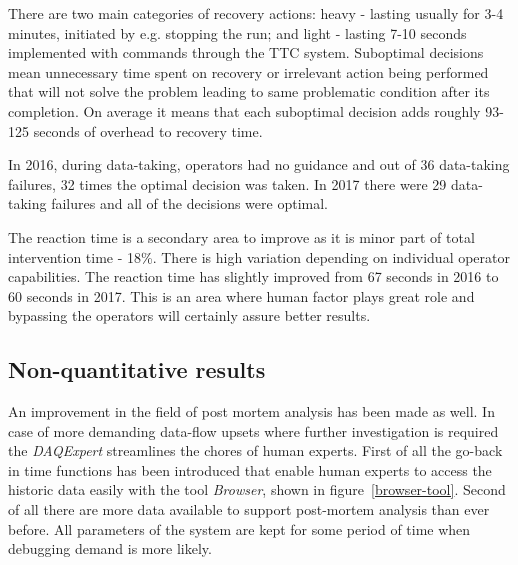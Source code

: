 \documentclass[a4paper]{jpconf}
\begin{document}
There are two main categories of recovery actions: heavy - lasting usually for 3-4 minutes, initiated by e.g. stopping the run; and light - lasting 7-10 seconds implemented with commands through the TTC system. Suboptimal decisions mean unnecessary time spent on recovery or irrelevant action being performed that will not solve the problem leading to same problematic condition after its completion. On average it means that each suboptimal decision adds roughly 93-125 seconds of overhead to recovery time.

In 2016, during data-taking, operators had no guidance and out of 36 data-taking failures, 32 times the optimal decision was taken. In 2017 there were 29 data-taking failures and all of the decisions were optimal.

The reaction time is a secondary area to improve as it is minor part of total intervention time - 18\%. There is high variation depending on individual operator capabilities. The reaction time has slightly improved from 67 seconds in 2016 to 60 seconds in 2017. This is an area where human factor plays great role and bypassing the operators will certainly assure better results.


\subsection{Non-quantitative results}
An improvement in the field of post mortem analysis has been made as well. In case of more demanding data-flow upsets where further investigation is required the{ \it DAQExpert} streamlines the chores of human experts. First of all the go-back in time functions has been introduced that enable human experts to access the historic data easily with the tool{ \it Browser}, shown in figure~\ref {browser-tool}. Second of all there are more data available to support post-mortem analysis than ever before. All parameters of the system are kept for some period of time when debugging demand is more likely.
\end{document}
